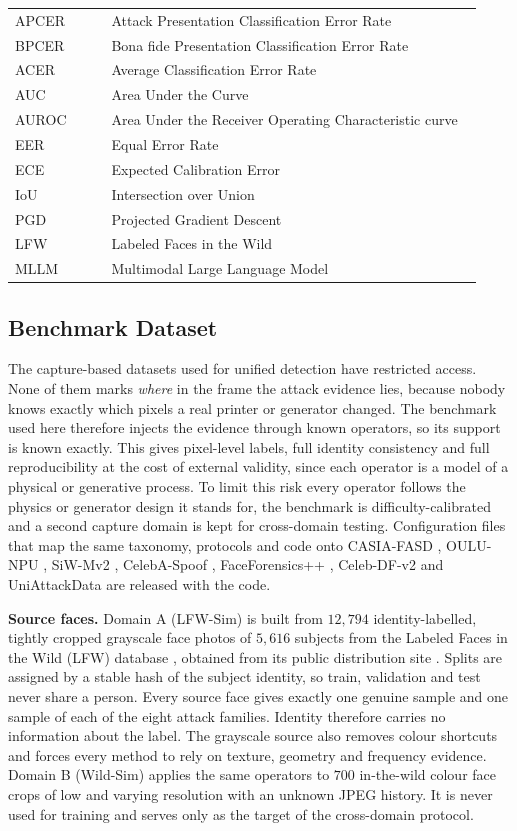 \documentclass[conference]{IEEEtran}
\newcommand{\sub}[1]{\subsection{\texorpdfstring{\textbf{#1}}{#1}}}
\begin{document}
\begin{table}
\begin{minipage}[t]{0.49\textwidth}
\begin{tabular}[t]{@{}p{0.20\linewidth}p{0.77\linewidth}@{}}
APCER & Attack Presentation Classification Error Rate \\
BPCER & Bona fide Presentation Classification Error Rate \\
ACER & Average Classification Error Rate \\
AUC & Area Under the Curve \\
AUROC & Area Under the Receiver Operating Characteristic curve \\
EER & Equal Error Rate \\
ECE & Expected Calibration Error \\
IoU & Intersection over Union \\
PGD & Projected Gradient Descent \\
LFW & Labeled Faces in the Wild \\
MLLM & Multimodal Large Language Model \\
\bottomrule
\end{tabular}
\end{minipage}
\end{table}

\sub{Benchmark Dataset}
The capture-based datasets used for unified detection
\cite{yu2024unified,ma2025uniattackplus} have restricted access. None of them marks
\emph{where} in the frame the attack evidence lies, because nobody knows exactly which
pixels a real printer or generator changed. The benchmark used here therefore injects
the evidence through known operators, so its support is known exactly. This gives
pixel-level labels, full identity consistency and full reproducibility at the cost of
external validity, since each operator is a model of a physical or generative process.
To limit this risk every operator follows the physics or generator design it stands
for, the benchmark is difficulty-calibrated and a second capture domain is kept for
cross-domain testing. Configuration files that map the same taxonomy, protocols and
code onto CASIA-FASD \cite{zhang2012casia}, OULU-NPU \cite{boulkenafet2017oulu},
SiW-Mv2 \cite{guo2022siwmv2}, CelebA-Spoof \cite{zhang2020celebaspoof},
FaceForensics++ \cite{rossler2019ff}, Celeb-DF-v2 \cite{li2020celebdf} and
UniAttackData \cite{yu2024unified} are released with the code.

\textbf{Source faces.} Domain A (LFW-Sim) is built from $12{,}794$ identity-labelled,
tightly cropped grayscale face photos of $5{,}616$ subjects from the Labeled Faces in
the Wild (LFW) database \cite{huang2007lfw}, obtained from its public distribution
site \cite{lfwweb}. Splits are assigned by a stable hash of the subject identity, so
train, validation and test never share a person. Every source face gives exactly one
genuine sample and one sample of each of the eight attack families. Identity therefore
carries no information about the label. The grayscale source also removes colour
shortcuts and forces every method to rely on texture, geometry and frequency evidence.
Domain B (Wild-Sim) applies the same operators to $700$ in-the-wild colour face crops \cite{wildsim}
of low and varying resolution with an unknown JPEG history. It is never used for
training and serves only as the target of the cross-domain protocol.
\end{document}

